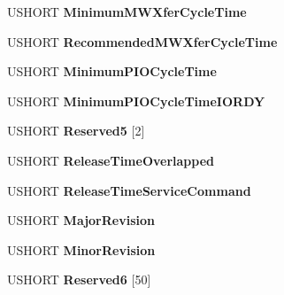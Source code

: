 \begin{DoxyCompactItemize}
U\+S\+H\+O\+RT {\bfseries Minimum\+M\+W\+Xfer\+Cycle\+Time}
\item 
\mbox{\label{struct___i_d_e_n_t_i_f_y___d_a_t_a_aea07f961ea12a359f1d5167c2d5d1a38}} 
U\+S\+H\+O\+RT {\bfseries Recommended\+M\+W\+Xfer\+Cycle\+Time}
\item 
\mbox{\label{struct___i_d_e_n_t_i_f_y___d_a_t_a_aff4e4f2dc39f0d14cb71e2c3c5f2c300}} 
U\+S\+H\+O\+RT {\bfseries Minimum\+P\+I\+O\+Cycle\+Time}
\item 
\mbox{\label{struct___i_d_e_n_t_i_f_y___d_a_t_a_aeb8f8a60b51288ad4f905909baff8fab}} 
U\+S\+H\+O\+RT {\bfseries Minimum\+P\+I\+O\+Cycle\+Time\+I\+O\+R\+DY}
\item 
\mbox{\label{struct___i_d_e_n_t_i_f_y___d_a_t_a_a18b02babf5922401bd880ce55912dbaa}} 
U\+S\+H\+O\+RT {\bfseries Reserved5} \mbox{[}2\mbox{]}
\item 
\mbox{\label{struct___i_d_e_n_t_i_f_y___d_a_t_a_af6b76091935ed88789f6b804c901c362}} 
U\+S\+H\+O\+RT {\bfseries Release\+Time\+Overlapped}
\item 
\mbox{\label{struct___i_d_e_n_t_i_f_y___d_a_t_a_a9203bbfd6fb0ffbee66a9ad6558188c1}} 
U\+S\+H\+O\+RT {\bfseries Release\+Time\+Service\+Command}
\item 
\mbox{\label{struct___i_d_e_n_t_i_f_y___d_a_t_a_a7de9248781c4649472dfa9ae70e681a4}} 
U\+S\+H\+O\+RT {\bfseries Major\+Revision}
\item 
\mbox{\label{struct___i_d_e_n_t_i_f_y___d_a_t_a_a58462d45528e4da1196356caf99beca2}} 
U\+S\+H\+O\+RT {\bfseries Minor\+Revision}
\item 
\mbox{\label{struct___i_d_e_n_t_i_f_y___d_a_t_a_a385265b25964993d11dc9888b364b438}} 
U\+S\+H\+O\+RT {\bfseries Reserved6} \mbox{[}50\mbox{]}
\item 
\mbox{\label{struct___i_d_e_n_t_i_f_y___d_a_t_a_ae020de8e604b97a3eb89b0fefb49586f}} 

\end{DoxyCompactItemize}
